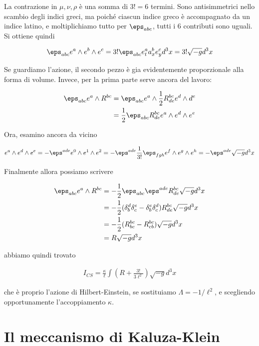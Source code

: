 \documentclass{report}
\begin{document}
La contrazione in \(\mu, \nu, \rho\) è una somma di \(3! = 6\) termini. Sono antisimmetrici nello scambio degli indici greci, ma poiché ciascun indice greco è accompagnato da un indice latino, e moltiplichiamo tutto per \(\eps_{abc}\), tutti i 6 contributi sono uguali. Si ottiene quindi 

\begin{align}
    \eps_{abc}e^a \wedge e^b \wedge e^c = 3! \eps_{abc}e^a_t a^b_x e^c_y d^3x = 3! \sqrt{-g}d^3x 
\end{align}

Se guardiamo l'azione, il secondo pezzo è gia evidentemente proporzionale alla forma di volume. Invece, per la prima parte serve ancora del lavoro: 

\begin{align}
    \eps_{abc}e^a \wedge R^{bc} &= \eps_{abc}e^a \wedge \frac{1}{2}R^{bc}_{de} e^d \wedge d^e \\
    &= \frac{1}{2}\eps_{abc}R^{bc}_{de}e^a \wedge e^d \wedge e^e 
\end{align}

Ora, esamino ancora da vicino 

\begin{align}
    e^a \wedge e^d \wedge e^e = -\eps^{ade}e^0 \wedge e^1 \wedge e^2 = -\eps^{ade}\frac{1}{3!}\eps_{fgh}e^f \wedge e^g \wedge e^h = -\eps^{ade}\sqrt{-g}d^3x
\end{align}

Finalmente allora possiamo scrivere 

\begin{align}
    \eps_{abc}e^a \wedge R^{bc} &= -\frac{1}{2}\eps_{abc}\eps^{ade}R^{bc}_{de}\sqrt{-g}d^3x \\
    &= -\frac{1}{2}(\delta^d_b\delta^e_c - \delta^e_b \delta^d_c)R^{bc}_{de}\sqrt{-g}d^3x \\ 
    &= -\frac{1}{2}(R^{bc}_{bc} - R^{bc}_{cb})\sqrt{-g}d^3x \\
    &= R\sqrt{-g}d^3x
\end{align}

abbiamo quindi trovato 

\begin{align}
    I_{CS} = \frac{\kappa}{\ell}\int \left(R + \frac{3!}{3\ell^2} \right)\sqrt{-g}d^3x
\end{align}

che è proprio l'azione di Hilbert-Einstein, se sostituiamo \(\Lambda = -1/\ell^2\), e scegliendo opportunamente l'accoppiamento \(\kappa\).  

\section{Il meccanismo di Kaluza-Klein}
\end{document}
